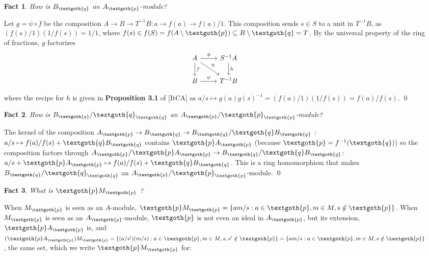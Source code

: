 \documentclass{article}
\newtheorem{theorem}{Fact}[section]
\begin{document}
\begin{theorem}
How is $B_\textgoth{q}$ an $A_\textgoth{p}$-module?
\end{theorem}

\noindent
Let $g = \psi \circ f$ be the composition $A \rightarrow B \rightarrow T^{-1}B : a \rightarrow f(a) \rightarrow f(a)/1 $. This composition sends $s \in S$ to a unit in $T^{-1}B$, as $(f(s)/1)(1/f(s)) = 1/1$, where $f(s) \in f(S) = f(A \setminus \textgoth{p}) \subseteq B \setminus \textgoth{q} = T$. By the universal property of the ring of fractions, $g$ factorizes
\[
     \begin{tikzcd}
     A \arrow{r}{\phi} \arrow{d}{f} \arrow{dr}{\eta} & S^{-1}A \arrow{d}{h} \\
     B \arrow{r}{\psi} & T^{-1}B
     \end{tikzcd}
\]

\noindent
where the recipe for $h$ is given in \textbf{Proposition 3.1} of [ItCA] as $a/s \mapsto g(a)g(s)^{-1} = (f(a)/1)(1/f(s)) = f(a)/f(s)$.
\qed

\begin{theorem}
How is $B_\textgoth{q} / \textgoth{q}_\textgoth{q}$ an $A_\textgoth{p} / \textgoth{p}_\textgoth{p}$-module?
\end{theorem}

\noindent
The kernel of the composition $A_\textgoth{p} \rightarrow B_\textgoth{q} \rightarrow B_\textgoth{q} / \textgoth{q} B_\textgoth{q}$ : $a/s \mapsto f(a)/f(s) + \textgoth{q} B_\textgoth{q}$ contains $\textgoth{p} A_\textgoth{p}$ (because $\textgoth{p} = f^{-1}(\textgoth{q})$) so the composition factors through $A_\textgoth{p} / \textgoth{p} A_\textgoth{p} \rightarrow B_\textgoth{q} / \textgoth{q} B_\textgoth{q}$: $a/s + \textgoth{p} A_\textgoth{p} \mapsto f(a)/f(s) + \textgoth{q} B_\textgoth{q}$. This is a ring homomorphism that makes $B_\textgoth{q} / \textgoth{q}_\textgoth{q}$ an $A_\textgoth{p} / \textgoth{p}_\textgoth{p}$-module.
\qed

\begin{theorem}
What is $\textgoth{p} M_\textgoth{p}$ ?
\end{theorem}

\noindent
When $M_\textgoth{p}$ is seen as an $A$-module, $\textgoth{p} M_\textgoth{p} = \{am/s: a \in \textgoth{p}, m \in M, s \notin \textgoth{p} \}$. When $M_\textgoth{p}$ is seen as an $A_\textgoth{p}$-module, $\textgoth{p}$ is not even an ideal in $A_\textgoth{p}$, but its extension, $\textgoth{p} A_\textgoth{p}$ is, and $(\textgoth{p} A_\textgoth{p}) M_\textgoth{p} = \{(a/s')(m/s): a \in \textgoth{p}, m \in M, s, s' \notin \textgoth{p} \} = \{am/s: a \in \textgoth{p}, m \in M, s \notin \textgoth{p} \}$, the same set, which we write $\textgoth{p} M_\textgoth{p}$ for:
\end{document}
